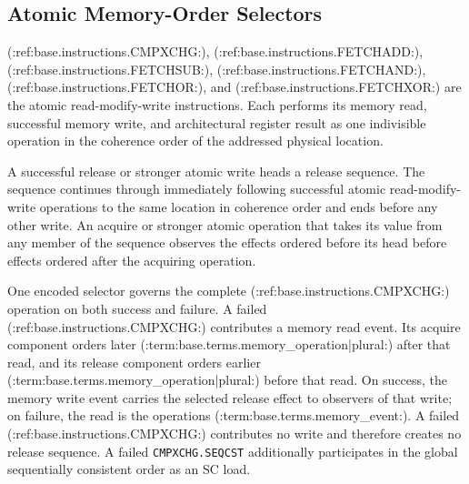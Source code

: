 \subsection{Atomic Memory-Order Selectors}


(:ref:base.instructions.CMPXCHG:), (:ref:base.instructions.FETCHADD:), (:ref:base.instructions.FETCHSUB:), (:ref:base.instructions.FETCHAND:), (:ref:base.instructions.FETCHOR:), and
(:ref:base.instructions.FETCHXOR:) are the atomic read-modify-write instructions. Each performs its memory read, successful memory
write, and architectural register result as one indivisible operation in the coherence order of the addressed
physical location.

A successful release or stronger atomic write heads a release sequence. The sequence continues through immediately
following successful atomic read-modify-write operations to the same location in coherence order and ends before any
other write. An acquire or stronger atomic operation that takes its value from any member of the sequence observes
the effects ordered before its head before effects ordered after the acquiring operation.

One encoded selector governs the complete (:ref:base.instructions.CMPXCHG:) operation on both success and failure. A failed
(:ref:base.instructions.CMPXCHG:) contributes a memory read event. Its acquire component orders later (:term:base.terms.memory_operation|plural:) after that read, and
its release component orders earlier (:term:base.terms.memory_operation|plural:) before that read. On success, the memory write event carries the
selected release effect to observers of that write; on failure, the read is the operation\textquotesingle{}s (:term:base.terms.memory_event:). A failed
(:ref:base.instructions.CMPXCHG:) contributes no write and therefore creates no release sequence. A failed
\texttt{CMPXCHG.SEQCST} additionally participates in the global sequentially consistent order as an SC load.
